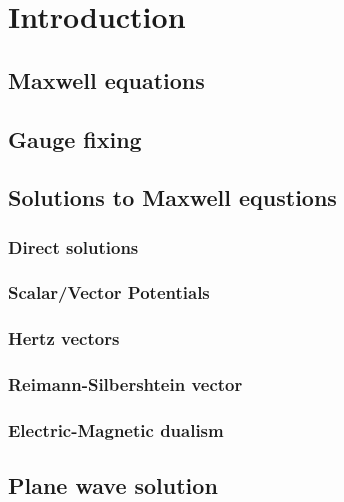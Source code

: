 \section{Introduction}
	\subsection{Maxwell equations}
	\subsection{Gauge fixing}
	\subsection{Solutions to Maxwell equstions}
		\subsubsection{Direct solutions}
		\subsubsection{Scalar/Vector Potentials}
		\subsubsection{Hertz vectors}
		\subsubsection{Reimann-Silbershtein vector}
		\subsubsection{Electric-Magnetic dualism}
	\subsection{Plane wave solution}